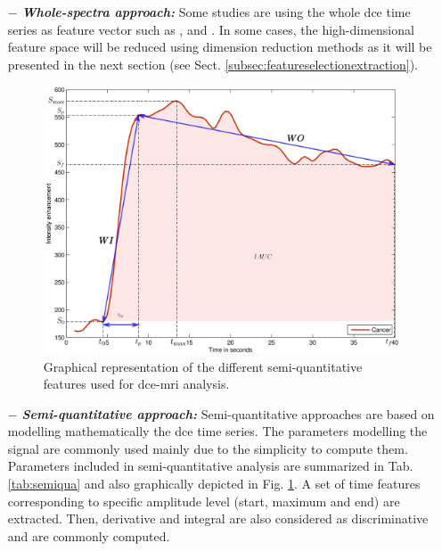 \begin{enumerate}[leftmargin=*]

\item[$-$] \textbf{\textit{Whole-spectra approach:}} Some studies are using the whole \ac{dce} time series as feature vector such as \cite{Ampeliotis2007,Ampeliotis2008}, \cite{Tiwari2012} and \cite{Viswanath2008a,Viswanath2008}. In some cases, the high-dimensional feature space will be reduced using dimension reduction methods as it will be presented in the next section (see Sect. \ref{subsec:featureselectionextraction}).

\begin{figure}
	\centering
	\includegraphics[width=\linewidth]{04_data_classification/06_feature_detection/figures/dce/dce_cancer_parameters.eps}
	\caption{Graphical representation of the different semi-quantitative features used for \ac{dce}-\ac{mri} analysis.}
	\label{fig:dceparam}
\end{figure}

\item[$-$] \textbf{\textit{Semi-quantitative approach:}} Semi-quantitative approaches are based on modelling mathematically the \ac{dce} time series. The parameters modelling the signal are commonly used mainly due to the simplicity to compute them. Parameters included in semi-quantitative analysis are summarized in Tab. \ref{tab:semiqua} and also graphically depicted in Fig. \ref{fig:dceparam}. A set of time features corresponding to specific amplitude level (start, maximum and end) are extracted. Then, derivative and integral are also considered as discriminative and are commonly computed.


\end{enumerate}

